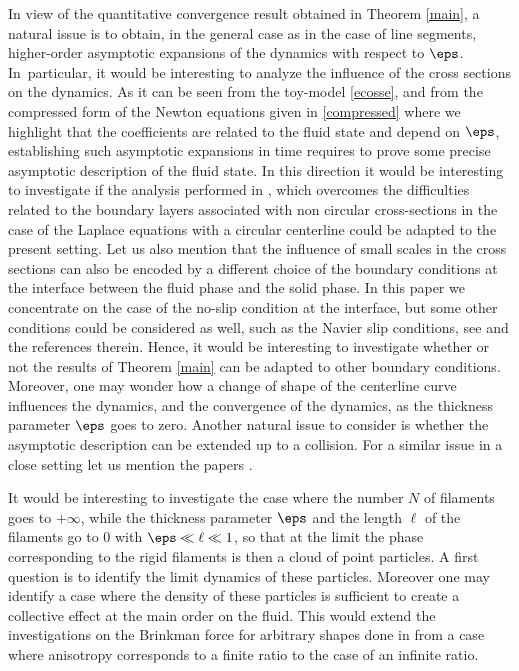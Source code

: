 \begin{op}
In view of the quantitative convergence result obtained in Theorem \ref{main}, a
natural issue is to obtain, in the general case as in the case of line segments, higher-order asymptotic expansions of the dynamics with respect to $\eps$.
In~particular, it would be interesting to analyze the influence of the cross sections on the dynamics.
As it can be seen from the toy-model \eqref{ecosse}, and from the compressed form of the Newton equations given in \eqref{compressed}
where we highlight that the coefficients are related to the fluid state and
depend on $\eps$, establishing such asymptotic expansions in time requires to prove some precise asymptotic description of the fluid state.
In this direction it would be interesting to investigate if the analysis performed in \cite[Chap.\,12.2]{MNP}, which overcomes the difficulties related to the boundary layers associated with non circular cross-sections in the case of the Laplace equations with a circular centerline could be adapted to the present setting.
Let us also mention that the influence of small scales in the cross sections can also be encoded by a different choice of the boundary conditions at the interface between the fluid phase and the solid phase.
In this paper we concentrate on the case of the no-slip condition at the interface, but some other conditions could be considered as well, such as the Navier slip
conditions, see \cite{HP20} and the references therein. Hence, it would be
interesting to investigate whether or not the results of Theorem \ref{main} can be adapted to other boundary conditions.
Moreover, one may wonder how a change of shape of the centerline curve influences the dynamics, and the convergence of the dynamics, as the thickness parameter $\eps$ goes to zero. Another natural issue to consider is whether the asymptotic description can be extended up to a collision. For a similar issue in a close setting let us mention the papers \cite{BNDRDM1,BNDRDM2}.
\end{op}

\begin{op} \label{op-cloud}
It would be interesting to investigate the case where the number $N$ of filaments goes to $+\infty$, while the thickness parameter $\eps$
and the length $\ell$ of the filaments go to $0$ with $\eps \ll \ell \ll 1$, so that at the limit the phase corresponding to the rigid filaments is then a cloud of point particles. A first question is to identify the limit dynamics of these particles. Moreover one may identify a case where the density of these particles is sufficient to create a collective effect at the main order on the fluid. This would extend the investigations on the Brinkman force for arbitrary shapes done in \cite{FNN,HMS} from a case where anisotropy corresponds to a finite ratio to the case of an infinite ratio.
\end{op}

